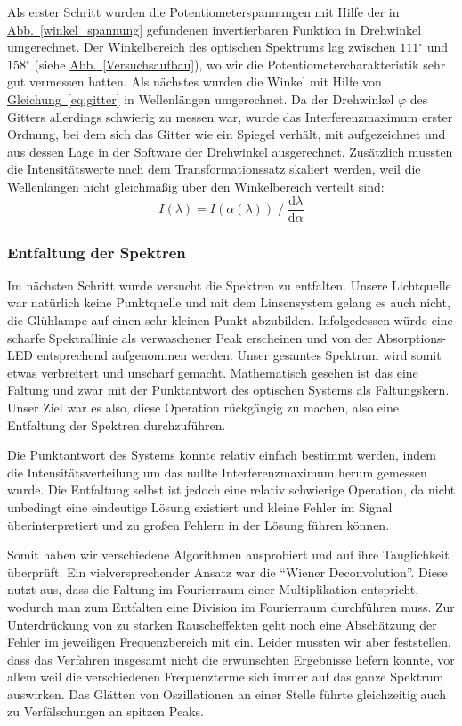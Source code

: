 \documentclass[11pt]{scrartcl}
\newcommand{\degr}{\ensuremath{^\circ}}
\newcommand{\dif}{\ensuremath{\mathrm{d}}}
\newcommand{\hypref}[2]{\hyperref[#2]{{#1}~\ref{#2}}}
\begin{document}
Als erster Schritt wurden die Potentiometerspannungen mit Hilfe der in \hypref{Abb.}{winkel_spannung} gefundenen invertierbaren Funktion in Drehwinkel umgerechnet.
Der Winkelbereich des optischen Spektrums lag zwischen $111\degr$ und $158\degr$ (siehe \hypref{Abb.}{Versuchsaufbau}), wo wir die Potentiometercharakteristik sehr gut vermessen hatten.
Als nächstes wurden die Winkel mit Hilfe von \hypref{Gleichung}{eq:gitter} in Wellenlängen umgerechnet. Da der Drehwinkel $\varphi$ des Gitters allerdings schwierig zu messen war, wurde das Interferenzmaximum erster Ordnung, bei dem sich das Gitter wie ein Spiegel verhält, mit aufgezeichnet und aus dessen Lage in der Software der Drehwinkel ausgerechnet. Zusätzlich mussten die Intensitätswerte nach dem Transformationssatz skaliert werden, weil die Wellenlängen nicht gleichmäßig über den Winkelbereich verteilt sind:
\begin{equation}
I(\lambda) = I(\alpha(\lambda)) \;/\; \frac{\dif\lambda}{\dif\alpha}
\end{equation}

\subsubsection{Entfaltung der Spektren}\label{sec:entfaltung}
Im nächsten Schritt wurde versucht die Spektren zu entfalten.
Unsere Lichtquelle war natürlich keine Punktquelle und mit dem Linsensystem gelang es auch nicht, die Glühlampe auf einen sehr kleinen Punkt abzubilden.
Infolgedessen würde eine scharfe Spektrallinie als verwaschener Peak erscheinen und von der Absorptions-LED entsprechend aufgenommen werden. Unser gesamtes Spektrum wird somit etwas verbreitert und unscharf gemacht.
Mathematisch gesehen ist das eine Faltung und zwar mit der Punktantwort des optischen Systems als Faltungskern.
Unser Ziel war es also, diese Operation rückgängig zu machen, also eine Entfaltung der Spektren durchzuführen.

Die Punktantwort des Systems konnte relativ einfach bestimmt werden, indem die Intensitätsverteilung um das nullte Interferenzmaximum herum gemessen wurde.
Die Entfaltung selbst ist jedoch eine relativ schwierige Operation, da nicht unbedingt eine eindeutige Lösung existiert und kleine Fehler im Signal überinterpretiert und zu großen Fehlern in der Lösung führen können.

Somit haben wir verschiedene Algorithmen ausprobiert und auf ihre Tauglichkeit überprüft.
Ein vielversprechender Ansatz war die "`Wiener Deconvolution"'.
Diese nutzt aus, dass die Faltung im Fourierraum einer Multiplikation entspricht, wodurch man zum Entfalten eine Division im Fourierraum durchführen muss.
Zur Unterdrückung von zu starken Rauscheffekten geht noch eine Abschätzung der Fehler im jeweiligen Frequenzbereich mit ein.
Leider mussten wir aber feststellen, dass das Verfahren insgesamt nicht die erwünschten Ergebnisse liefern konnte, vor allem weil die verschiedenen Frequenzterme sich immer auf das ganze Spektrum auswirken.
Das Glätten von Oszillationen an einer Stelle führte gleichzeitig auch zu Verfälschungen an spitzen Peaks.
\end{document}
